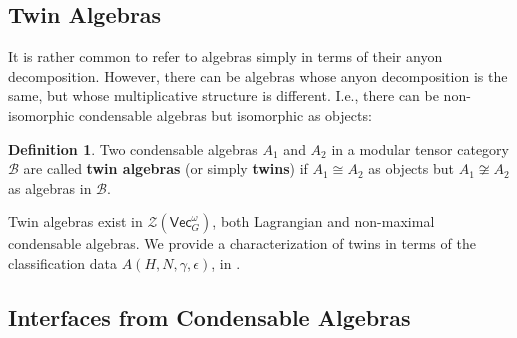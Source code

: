 \documentclass[aps,twocolumn,prx,floatfix,preprintnumbers, nofootinbib,10pt]{revtex4-2}
\numberwithin{equation}{section}
\theoremstyle{definition}
\newtheorem{definition}[theorem]{Definition}
\newcommand{\cB}{\mathcal{B}}
\newcommand{\cZ}{\mathcal{Z}}
\renewcommand{\Vec}{\mathsf{Vec}}
\begin{document}
\subsection{Twin Algebras}
\label{sec:TwinAlgebras}

It is rather common to refer to algebras simply in terms of their anyon decomposition. However, there can be algebras whose anyon decomposition is the same, but whose multiplicative structure is different. I.e., 
there can be non-isomorphic condensable algebras but isomorphic as objects:
\begin{definition}
\label{defn:twins}
    Two condensable algebras $A_1$ and $A_2$ in a modular tensor category $\cB$ are called {\bf twin algebras} (or simply {\bf twins}) if $A_1\cong A_2$ as objects but $A_1\not \cong A_2$ as algebras in $\cB$.
\end{definition}
Twin algebras exist in $\cZ(\Vec_G^\omega)$, both Lagrangian and non-maximal condensable algebras. 
We provide a characterization of twins in terms of the classification data $A (H, N, \gamma, \epsilon)$, in . 








\subsection{Interfaces from Condensable Algebras}
\label{sec:Fold}
\end{document}
